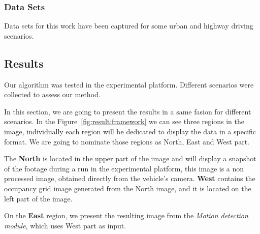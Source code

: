 \subsubsection*{Data Sets}
Data sets for this work have been captured for some urban and highway driving scenarios.

\subsection{Results}

Our algorithm was tested in the experimental platform. Different scenarios were collected to assess our method.

In this section, we are going to present the results in a same fasion for different scenarios. In the Figure~\ref{fig:result:framework} we can see three regions in the image, individually each region will be dedicated to display the data in a specific format. We are going to nominate those regions as North, East and West part. 

The \textbf{North} is located in the upper part of the image and will display a snapshot of the footage during a run in the experimental platform, this image is a non processed image, obtained directly from the vehicle's camera. \textbf{West} contains the occupancy grid image generated from the North image, and it is located on the left part of the image.

On the \textbf{East} region, we present the resulting image from the \textit{Motion detection module}, which uses West part as input.

